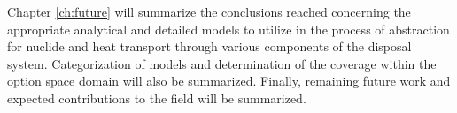 Chapter \ref{ch:future} will summarize the conclusions reached 
concerning the appropriate analytical and detailed models to utilize 
in the process of abstraction for nuclide and heat transport through 
various components of the disposal system. Categorization of models 
and determination of the coverage within the option space domain will 
also be summarized. Finally, remaining future work and expected 
contributions to the field will be summarized. 
